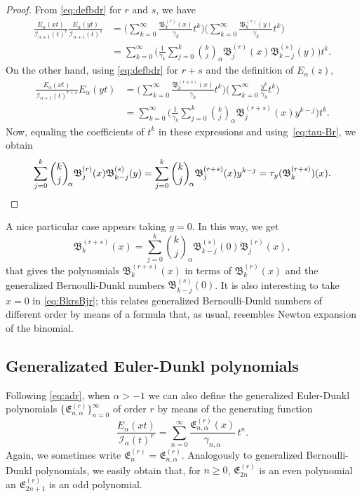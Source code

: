 \documentclass[10pt]{article}
\theoremstyle{plain}
\theoremstyle{definition}
\numberwithin{equation}{section} %
\newcommand{\Ea}{E_{\alpha}}
\newcommand{\binoma}[2]{\binom{#1}{#2}_{\!\alpha}}
\newcommand{\I}{\mathcal{I}}
\newcommand{\B}{\mathfrak{B}}
\newcommand{\E}{\mathfrak{E}}
\newcommand{\cc}{\gamma}
\begin{document}
\begin{proof}
From \eqref{eq:defbdr} for $r$ and $s$, we have 
\begin{align*}
  \frac{\Ea(xt)}{\I_{\alpha+1}(t)^r} \frac{\Ea(yt)}{\I_{\alpha+1}(t)^s}
  &= \biggl( \sum_{k=0}^{\infty} \frac{\B_k^{(r)}(x)}{\cc_k}t^k \biggr) 
  \biggl( \sum_{k=0}^{\infty}\frac{\B_k^{(s)}(y)}{\cc_k}t^k \biggr) \\
  &= \sum_{k=0}^{\infty} \biggl( \frac{1}{\cc_k} \sum_{j=0}^k\binoma{k}{j} \B_j^{(r)}(x)\B_{k-j}^{(s)}(y) \biggr) t^k.
\end{align*}
On the other hand, using \eqref{eq:defbdr} for $r+s$ and the definition of $\Ea(z)$,
\begin{align*}
  \frac{\Ea(xt)}{\I_{\alpha+1}(t)^{r+s}} \Ea(yt)
  &= \biggl( \sum_{k=0}^{\infty} \frac{\B_k^{(r+s)}(x)}{\cc_k}t^k \biggr) 
  \biggl( \sum_{k=0}^{\infty}\frac{y^k}{\cc_k}t^k \biggr) \\
  &= \sum_{k=0}^{\infty} \biggl( \frac{1}{\cc_k} \sum_{j=0}^k \binoma{k}{j}\B_{j}^{(r+s)}(x)y^{k-j} \biggr) t^k .
\end{align*}
Now, equaling the coefficients of $t^k$ in these expressions and using~\eqref{eq:tau-Br}, we obtain 
\[
  \sum_{j=0}^k\binoma{k}{j} \B_j^{(r)}(x)\B_{k-j}^{(s)}(y)
  = \sum_{j=0}^k\binoma{k}{j}\B_{j}^{(r+s)}(x)y^{k-j}
  = \tau_y(\B_k^{(r+s)})(x).
\qedhere
\]
\end{proof}

A nice particular case appears taking $y=0$. In this way, we get
\begin{equation}
\label{eq:BkrsBjr}
  \B_k^{(r+s)}(x) = \sum_{j=0}^k \binoma{k}{j} \B_{k-j}^{(s)}(0) \B_j^{(r)}(x),
\end{equation}
that gives the polynomials $\B_k^{(r+s)}(x)$ in terms of $\B_k^{(r)}(x)$
and the generalized Bernoulli-Dunkl numbers $\B_{k-j}^{(s)}(0)$.
It is also interesting to take $x=0$ in \eqref{eq:BkrsBjr}; this relates
generalized Bernoulli-Dunkl numbers of different order by means of a formula
that, as usual, resembles Newton expansion of the binomial.

\subsection{Generalizated Euler-Dunkl polynomials}

Following \eqref{eq:adr}, when $\alpha>-1$ we can also define the generalized Euler-Dunkl polynomials $\{\E_{n,\alpha}^{(r)}\}_{n=0}^{\infty}$ of order $r$ by means of the generating function
\begin{equation*}
  \frac{\Ea(xt)}{\I_{\alpha}(t)^r}
  = \sum_{n=0}^\infty \frac{\E_{n,\alpha}^{(r)}(x)}{\cc_{n,\alpha}}\,t^n.
\end{equation*}
Again, we sometimes write $\E_n^{(r)}=\E_{n,\alpha}^{(r)}$. Analogously to generalized Bernoulli-Dunkl polynomials, we easily obtain that, for $n\ge 0$, $\E_{2n}^{(r)}$ is an even polynomial an $\E_{2n+1}^{(r)}$ is an odd polynomial.
\end{document}
